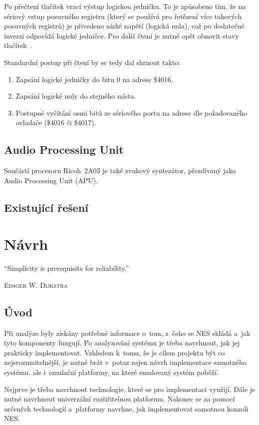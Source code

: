 Po přečtení tlačítek vrací výstup logickou jedničku. To je způsobeno tím, že na sériový vstup posuvného registru (který se používá pro řetězení více takových posuvných registrů) je přivedeno nízké napětí (logická nula), což po dodatečné inverzi odpovídá logické jedničce. Pro další čtení je nutné opět obnovit stavy tlačítek~\cite{Nesdev:standard-controller}.

Standardní postup při čtení by se tedy dal shrnout takto:
\begin{enumerate}
	\item Zapsání logické jedničky do bitu 0 na adrese \$4016.
	\item Zapsání logické nuly do stejného místa.
	\item Postupné vyčítání osmi bitů ze sériového portu na adrese dle požadovaného ovladače (\$4016 či \$4017).
\end{enumerate}

\section{Audio Processing Unit}
\label{sec:APU}
Součástí procesoru Ricoh~2A03 je také zvukový syntezátor, přezdívaný jako Audio Processing Unit (APU).

\section{Existující řešení}


\chapter{Návrh}
\epigraph{
	\enquote{Simplicity is prerequisite for reliability.}
}{\textsc{Edsger W. Dijkstra}}

\section{Úvod}
Při analýze byly získány potřebné informace o~tom, z~čeho se NES skládá a~jak tyto komponenty fungují. Po analyzování systému je třeba navrhnout, jak jej prakticky implementovat. Vzhledem k~tomu, že je cílem projektu být co nejsrozumitelnější, je nutné brát v~potaz nejen návrh implementace samotného systému, ale i~emulační platformy, na které emulovaný systém poběží.

Nejprve je třeba navrhnout technologie, které se pro implementaci využijí. Dále je nutné navrhnout univerzální rozšiřitelnou platformu. Nakonec se za pomocí určených technologií a~platformy navrhne, jak implementovat samotnou konzoli NES.

